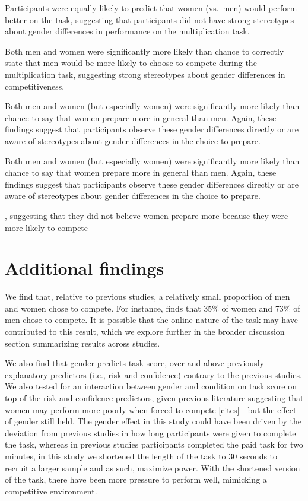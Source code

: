 \documentclass[a4paper,nobind]{templates/ociamthesis}
\begin{document}
Participants were equally likely to predict that women (vs.~men) would perform better on the task, suggesting that participants did not have strong stereotypes about gender differences in performance on the multiplication task.

Both men and women were significantly more likely than chance to correctly state that men would be more likely to choose to compete during the multiplication task, suggesting strong stereotypes about gender differences in competitiveness.

Both men and women (but especially women) were significantly more likely than chance to say that women prepare more in general than men. Again, these findings suggest that participants observe these gender differences directly or are aware of stereotypes about gender differences in the choice to prepare.

Both men and women (but especially women) were significantly more likely than chance to say that women prepare more in general than men. Again, these findings suggest that participants observe these gender differences directly or are aware of stereotypes about gender differences in the choice to prepare.

, suggesting that they did not believe women prepare more because they were more likely to compete

\hypertarget{additional-findings}{%
\section{Additional findings}\label{additional-findings}}

We find that, relative to previous studies, a relatively small proportion of men and women chose to compete. For instance, \textcite{Niederle2007} finds that 35\% of women and 73\% of men chose to compete. It is possible that the online nature of the task may have contributed to this result, which we explore further in the broader discussion section summarizing results across studies.

We also find that gender predicts task score, over and above previously explanatory predictors (i.e., risk and confidence) contrary to the previous studies. We also tested for an interaction between gender and condition on task score on top of the risk and confidence predictors, given previous literature suggesting that women may perform more poorly when forced to compete {[}cites{]} - but the effect of gender still held. The gender effect in this study could have been driven by the deviation from previous studies in how long participants were given to complete the task, whereas in previous studies participants completed the paid task for two minutes, in this study we shortened the length of the task to 30 seconds to recruit a larger sample and as such, maximize power. With the shortened version of the task, there have been more pressure to perform well, mimicking a competitive environment.
\end{document}
